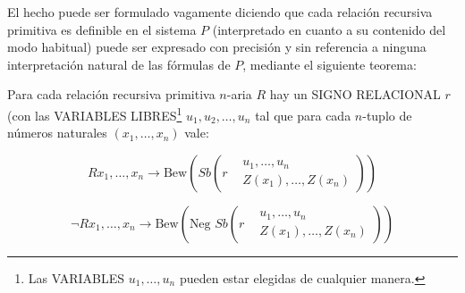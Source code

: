 El hecho puede ser formulado vagamente diciendo que cada relación recursiva primitiva es definible en el sistema $P$ (interpretado en cuanto a su 
contenido del modo habitual) puede ser expresado con precisión y sin referencia a ninguna interpretación natural de las fórmulas de $P$, 
mediante el siguiente teorema:

\begin{teorema} \label{teo:TeoremaV}
    Para cada relación recursiva primitiva $n$-aria $R$ hay un SIGNO RELACIONAL $r$ (con las VARIABLES LIBRES\footnote{Las VARIABLES $u_1, \dots, u_n$ pueden
    estar elegidas de cualquier manera.} $u_1, u_2, \dots, u_n$ tal que para cada $n$-tuplo de números naturales $(x_1, \dots, x_n)$ vale:
    
    \begin{equation} \label{eq:Teo5-3}
        R x_1, \dots, x_n \rightarrow \text{Bew} \left(Sb \left(r 
        \begin{aligned}
            &u_1, \dots, u_n\\
            &Z(x_1), \dots, Z(x_n)
        \end{aligned}\right)\right)
    \end{equation}

    \begin{equation} \label{eq:Teo5-4}
        \lnot R x_1, \dots, x_n \rightarrow \text{Bew} \left(\text{Neg } Sb \left(r 
        \begin{aligned}
            &u_1, \dots, u_n\\
            &Z(x_1), \dots, Z(x_n)
        \end{aligned}\right)\right)
    \end{equation}
\end{teorema}

